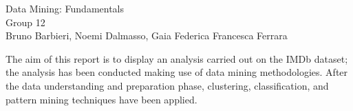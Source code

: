 \documentclass[12pt,openany]{report}
\begin{document}

\begin{center} %
     {\LARGE { Data Mining: Fundamentals}}\\
     \vspace{2cm}
    {\Large { Group 12 }}\\
     \vspace{2cm}
     {\large { Bruno Barbieri, Noemi Dalmasso, Gaia Federica Francesca Ferrara }}
\end{center}

The aim of this report is to display an analysis carried out on the IMDb dataset; the analysis has been conducted making use of data mining methodologies. 
After the data understanding and preparation phase, clustering, classification, and pattern mining techniques have been applied.


  



\tableofcontents

%
\end{document}
